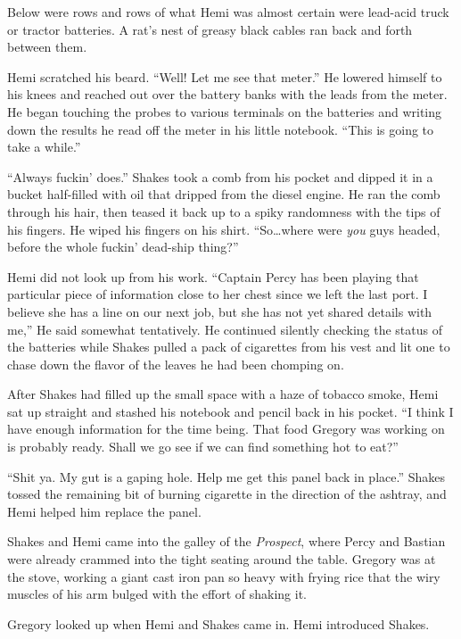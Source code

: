 \documentclass[
]{scrbook}
\begin{document}
Below were rows and rows of what Hemi was almost certain were lead-acid
truck or tractor batteries. A rat's nest of greasy black cables ran back
and forth between them.

Hemi scratched his beard. ``Well! Let me see that meter.'' He lowered
himself to his knees and reached out over the battery banks with the
leads from the meter. He began touching the probes to various terminals
on the batteries and writing down the results he read off the meter in
his little notebook. ``This is going to take a while.''

``Always fuckin' does.'' Shakes took a comb from his pocket and dipped
it in a bucket half-filled with oil that dripped from the diesel engine.
He ran the comb through his hair, then teased it back up to a spiky
randomness with the tips of his fingers. He wiped his fingers on his
shirt. ``So\ldots where were \emph{you} guys headed, before the whole
fuckin' dead-ship thing?''

Hemi did not look up from his work. ``Captain Percy has been playing
that particular piece of information close to her chest since we left
the last port. I believe she has a line on our next job, but she has not
yet shared details with me,'' He said somewhat tentatively. He continued
silently checking the status of the batteries while Shakes pulled a pack
of cigarettes from his vest and lit one to chase down the flavor of the
leaves he had been chomping on.

After Shakes had filled up the small space with a haze of tobacco smoke,
Hemi sat up straight and stashed his notebook and pencil back in his
pocket. ``I think I have enough information for the time being. That
food Gregory was working on is probably ready. Shall we go see if we can
find something hot to eat?''

``Shit ya. My gut is a gaping hole. Help me get this panel back in
place.'' Shakes tossed the remaining bit of burning cigarette in the
direction of the ashtray, and Hemi helped him replace the panel.

\bigskip

Shakes and Hemi came into the galley of the \emph{Prospect}, where Percy
and Bastian were already crammed into the tight seating around the
table. Gregory was at the stove, working a giant cast iron pan so heavy
with frying rice that the wiry muscles of his arm bulged with the effort
of shaking it.

Gregory looked up when Hemi and Shakes came in. Hemi introduced Shakes.
\end{document}

